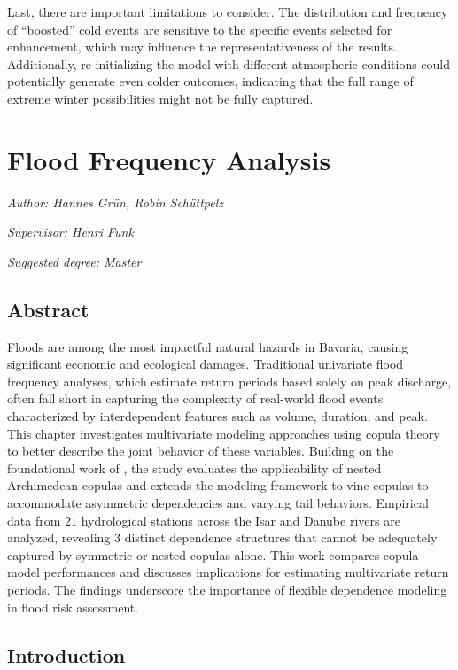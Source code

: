 \documentclass[
]{krantz}
\begin{document}
Last, there are important limitations to consider. The distribution and frequency of ``boosted'' cold events are sensitive to the specific events selected for enhancement, which may influence the representativeness of the results. Additionally, re-initializing the model with different atmospheric conditions could potentially generate even colder outcomes, indicating that the full range of extreme winter possibilities might not be fully captured.



\chapter{Flood Frequency Analysis}\label{flood-frequency-analysis}

\emph{Author: Hannes Grün, Robin Schüttpelz}

\emph{Supervisor: Henri Funk}

\emph{Suggested degree: Master}

\section*{Abstract}\label{abstract-3}


Floods are among the most impactful natural hazards in Bavaria,
causing significant economic and ecological damages.
Traditional univariate flood frequency analyses,
which estimate return periods based solely on peak discharge,
often fall short in capturing the complexity of real-world flood events characterized by interdependent
features such as volume, duration, and peak.
This chapter investigates multivariate modeling approaches using copula theory to better describe
the joint behavior of these variables.
Building on the foundational work of \citet{grimaldi2006}, the study evaluates the applicability
of nested Archimedean copulas and extends the modeling framework to vine copulas
to accommodate asymmetric dependencies and varying tail behaviors.
Empirical data from \(21\) hydrological stations across the Isar and Danube rivers are analyzed,
revealing \(3\) distinct dependence structures that cannot be adequately captured by symmetric or
nested copulas alone. This work compares copula model performances
and discusses implications for estimating multivariate return periods.
The findings underscore the importance of flexible dependence modeling in flood risk
assessment.

\section{Introduction}\label{intro}
\end{document}
